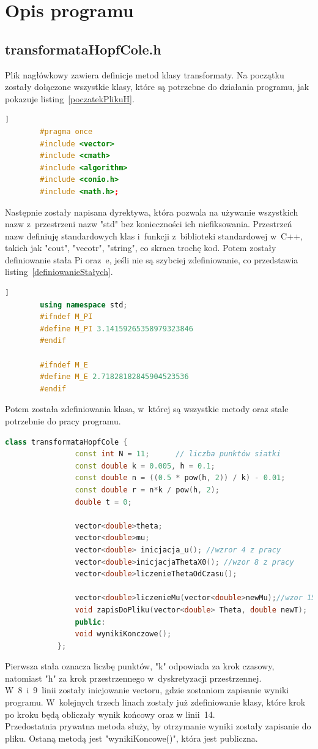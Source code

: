 \documentclass[10pt, a4paper]{article}
\begin{document}
	\section{Opis programu}
	\subsection{transformataHopfCole.h}
	Plik nagłówkowy zawiera definicje metod klasy transformaty. Na początku zostały dołączone wszystkie klasy, które są potrzebne do działania programu, jak pokazuje listing~\ref{poczatekPlikuH}.
		\begin{lstlisting}[caption={początek pliku transformataHopfCole.h},label={poczatekPlikuH}, language=C++]]
		#pragma once
		#include <vector>
		#include <cmath>
		#include <algorithm>
		#include <conio.h>
		#include <math.h>;\end{lstlisting}
	Następnie zostały napisana dyrektywa, która pozwala na używanie wszystkich nazw z~przestrzeni nazw "std" bez konieczności ich niefiksowania. Przestrzeń nazw definiuję standardowych klas i~funkcji z~biblioteki standardowej w~C++, takich jak "cout", "vecotr", "string", co skraca trochę kod. Potem zostały definiowanie stała Pi oraz~e, jeśli nie są szybciej zdefiniowanie, co przedstawia listing~\ref{definiowanieStałych}. 
	\begin{lstlisting}[caption={początek pliku definiowanieStałych},label={zdefiniowanie stałych}, language=C++]]
		using namespace std;
		#ifndef M_PI
		#define M_PI 3.14159265358979323846
		#endif
		
		#ifndef M_E
		#define M_E 2.71828182845904523536
		#endif\end{lstlisting}
		
	Potem została zdefiniowania klasa, w~której są wszystkie metody oraz stale potrzebnie do pracy programu.
			\begin{lstlisting}[caption={klasa tranformataHopfCofe},label={klasa}, language=C++]
			class transformataHopfCole {
				const int N = 11;      // liczba punktów siatki
				const double k = 0.005, h = 0.1;
				const double n = ((0.5 * pow(h, 2)) / k) - 0.01;
				const double r = n*k / pow(h, 2);
				double t = 0;
				
				vector<double>theta;
				vector<double>mu;
				vector<double> inicjacja_u(); //wzror 4 z pracy
				vector<double>inicjacjaThetaX0(); //wzor 8 z pracy
				vector<double>liczenieThetaOdCzasu();
				
				vector<double>liczenieMu(vector<double>newMu);//wzor 15
				void zapisDoPliku(vector<double> Theta, double newT);
				public:
				void wynikiKonczowe();
			};\end{lstlisting}
		Pierwsza stała oznacza liczbę punktów, "k" odpowiada za krok czasowy, natomiast "h" za krok przestrzennego w~dyskretyzacji przestrzennej.\\
		W~8~i~9~linii zostały inicjowanie vectoru, gdzie zostaniom zapisanie wyniki programu. W~kolejnych trzech linach zostały już zdefiniowanie klasy, które krok po kroku będą obliczały wynik końcowy oraz w linii~14.\\
		Przedostatnia prywatna metoda służy, by otrzymanie wyniki zostały zapisanie do pliku. Ostaną metodą jest "wynikiKoncowe()", która jest publiczna. 
\end{document}
